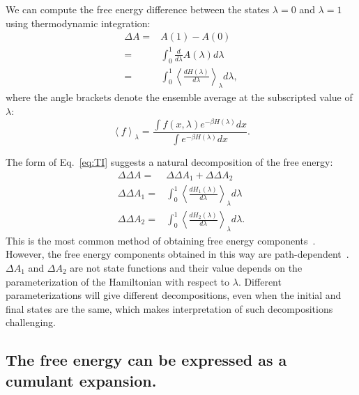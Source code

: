 \documentclass{article}
\begin{document}
We can compute the free energy difference between the states $\lambda=0$ and $\lambda=1$ using thermodynamic integration:
\begin{align}
\Delta A =&  A(1) - A(0) \nonumber\\
               =& \int_0^1 \frac{d}{d\lambda}  A(\lambda) d\lambda \nonumber\\
               =& \int_0^1 \left\langle \frac{dH(\lambda)}{d\lambda}\right\rangle_\lambda 
                d\lambda \label{eq:TI},
\end{align}
where the angle brackets denote the ensemble average at the subscripted value of $\lambda$:
\begin{equation}
\left\langle f \right\rangle_\lambda = \frac
	{\int f(x, \lambda) e^{-\beta H(\lambda)} dx}
    {\int e^{-\beta H(\lambda)} dx}.
\end{equation}


The form of Eq.~\ref{eq:TI} suggests a natural decomposition of the free energy:
\begin{align}
\Delta\Delta A =& \Delta\Delta A_1 + \Delta\Delta A_2 \nonumber\\
\Delta\Delta A_1 =&
	\int_0^1 \left\langle \frac{dH_1(\lambda)}{d\lambda}\right\rangle_\lambda d\lambda \nonumber\\
\Delta\Delta A_2 =&
	\int_0^1 \left\langle \frac{dH_2(\lambda)}{d\lambda}\right\rangle_\lambda d\lambda.    
\label{eq:naive}
\end{align}
This is the most common method of obtaining free energy components~\cite{NULL}. However, the free energy components obtained in this way are path-dependent~\cite{NULL}. $\Delta A_1$ and $\Delta A_2$ are not state functions and their value depends on the parameterization of the Hamiltonian with respect to $\lambda$. Different parameterizations will give different decompositions, even when the initial and final states are the same, which makes interpretation of such decompositions challenging.



\subsection{The free energy can be expressed as a cumulant expansion.}
\end{document}

